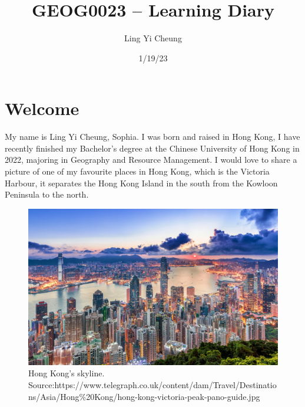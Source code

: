 \documentclass[
  letterpaper,
  DIV=11,
  numbers=noendperiod]{scrreprt}
\title{GEOG0023 -- Learning Diary}
\author{Ling Yi Cheung}
\date{1/19/23}
\renewcommand*\contentsname{Table of contents}
\newcommand\contentsname{Table of contents}
\begin{document}
\maketitle
\ifdefined\Shaded\renewenvironment{Shaded}{\begin{tcolorbox}[sharp corners, interior hidden, boxrule=0pt, borderline west={3pt}{0pt}{shadecolor}, enhanced, breakable, frame hidden]}{\end{tcolorbox}}\fi

\renewcommand*\contentsname{Table of contents}
{
\hypersetup{linkcolor=}
\setcounter{tocdepth}{2}
\tableofcontents
}

\hypertarget{welcome}{%
\chapter*{Welcome}\label{welcome}}


My name is Ling Yi Cheung, Sophia. I was born and raised in Hong Kong, I
have recently finished my Bachelor's degree at the Chinese University of
Hong Kong in 2022, majoring in Geography and Resource Management. I
would love to share a picture of one of my favourite places in Hong
Kong, which is the Victoria Harbour, it separates the Hong Kong Island
in the south from the Kowloon Peninsula to the north.

\begin{figure}

{\centering \includegraphics[width=1\textwidth,height=\textheight]{./figures/Hong-Kong.jpeg}

}

\caption{Hong Kong's skyline.
Source:https://www.telegraph.co.uk/content/dam/Travel/Destinations/Asia/Hong\%20Kong/hong-kong-victoria-peak-pano-guide.jpg}

\end{figure}
\end{document}
